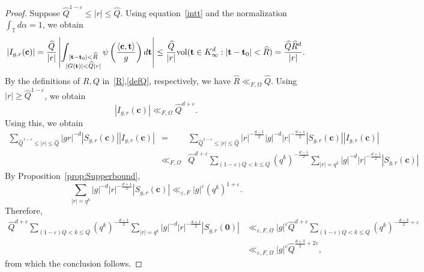 \documentclass[10pt]{amsart}
\theoremstyle{plain}
\theoremstyle{plain}
\newtheorem{lemma}[theorem]{Lemma}
\renewcommand{\vec}[1]{\mathbf{#1}}
\theoremstyle{remark}
\theoremstyle{definition}
\renewcommand{\hat}{\widehat}
\newcommand{\Ki}{K_\infty}
\newcommand{\hQ}{\widehat{Q}}
\newcommand{\hR}{\widehat{R}}
\newcommand{\TT}{\mathbb{T}}
\newcommand{\vol}{\textup{vol}}
\begin{document}
\begin{proof}
Suppose $\hQ^{1-\varepsilon}\leq |r|\leq\hQ$. Using equation~\eqref{intt} and the normalization $\int_{\TT}d\alpha=1$, we obtain
\[|I_{g,r}(\vec{c})|= \frac{\hQ}{|r|}\left|\int_{\substack{|\vec{t}-\vec{t}_0| < \hR \\ |G(\vec{t})|< \hQ|r|}} \psi\left(\frac{\left<\vec{c},\vec{t}\right>}{g}\right)d\vec{t}\right|\leq \frac{\hQ}{|r|}\vol(\vec{t}\in\Ki^d:|\vec{t}-\vec{t}_0|<\hR)=\frac{\hQ\hR^d}{|r|}.\]
By the definitions of $R,Q$ in~\eqref{R},\eqref{defQ}, respectively, we have $\hR\ll_{F,\Omega}\hQ$. Using $|r|\geq\hQ^{1-\varepsilon}$, we obtain
\[|I_{g,r}(\vec{c})|\ll_{F,\Omega}\hQ^{d+\varepsilon}.\]
Using this, we obtain
\begin{eqnarray*}\sum_{\hQ^{1-\varepsilon}\leq |r|\leq\hQ}|gr|^{-d}|S_{g,r}(\vec{c})||I_{g,r}(\vec{c})|&=& \sum_{\hQ^{1-\varepsilon}\leq |r|\leq\hQ}|r|^{-\frac{d-1}{2}}|g|^{-d}|r|^{-\frac{d+1}{2}}|S_{g,r}(\vec{c})||I_{g,r}(\vec{c})|\\ &\ll_{F,\Omega}& \hQ^{d+\varepsilon}\sum_{(1-\varepsilon)Q<k\leq Q}\left(q^k\right)^{-\frac{d-1}{2}}\sum_{|r|=q^k}|g|^{-d}|r|^{-\frac{d+1}{2}}|S_{g,r}(\vec{c})|
\end{eqnarray*}
By Proposition~\ref{prop:Supperbound},
\[\sum_{|r|=q^k}|g|^{-d}|r|^{-\frac{d+1}{2}}|S_{g,r}(\vec{c})|\ll_{\varepsilon,F} |g|^{\varepsilon}\left(q^k\right)^{1+\varepsilon}.\]
Therefore,
\begin{align*}
\hQ^{d+\varepsilon}\sum_{(1-\varepsilon)Q<k\leq Q}\left(q^k\right)^{-\frac{d-1}{2}}\sum_{|r|=q^k}|g|^{-d}|r|^{-\frac{d+1}{2}}|S_{g,r}(\vec{0})|&\ll_{\varepsilon,F,\Omega} |g|^{\varepsilon}\hQ^{d+\varepsilon}\sum_{(1-\varepsilon)Q<k\leq Q}\left(q^k\right)^{-\frac{d-3}{2}+\varepsilon}\\&\ll_{\varepsilon,F,\Omega} |g|^{\varepsilon}\hQ^{\frac{d+3}{2}+2\varepsilon},
\end{align*}
from which the conclusion follows.
\end{proof}
\end{document}
